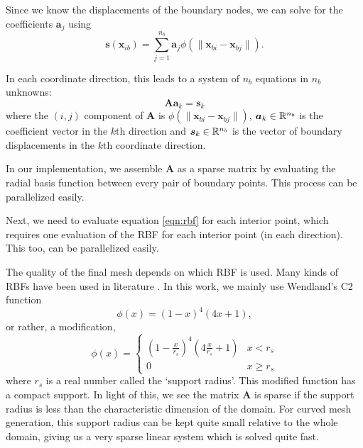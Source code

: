  Since we know the displacements of the boundary nodes, we can solve for the coefficients $\mathbf{a}_j$ using
 \begin{equation}
 \mathbf{s}(\mathbf{x}_{ib}) = \sum_{j=1}^{n_b} \mathbf{a}_j \phi(\lVert\mathbf{x}_{bi} - \mathbf{x}_{bj}\rVert).
 \end{equation}
 
 In each coordinate direction, this leads to a system of $n_b$ equations in $n_b$ unknowns:
 \begin{equation}
 \mathbf{A}\mathbf{a}_k = \mathbf{s}_k
 \end{equation}
 where the $(i,j)$ component of $\mathbf{A}$ is $\phi(\lVert\mathbf{x}_{bi} - \mathbf{x}_{bj} \rVert)$, $ \boldsymbol{a}_k \in \mathbb{R}^{n_b}$ is the coefficient vector in the $k$th direction and $\boldsymbol{s}_k \in \mathbb{R}^{n_b}$ is the vector of boundary displacements in the $k$th coordinate direction.
 
 In our implementation, we assemble $\mathbf{A}$ as a sparse matrix by evaluating the radial basis function between every pair of boundary points. This process can be parallelized easily.
 
 Next, we need to evaluate equation \eqref{eqn:rbf} for each interior point, which requires one evaluation of the RBF for each interior point (in each direction). This too, can be parallelized easily.
 
 The quality of the final mesh depends on which RBF is used. Many kinds of RBFs have been used in literature \cite{mm:rbf, mm:rbf2}. In this work, we mainly use Wendland's C2 function
 \begin{equation}
 \phi(x) = (1-x)^4(4x + 1),
 \end{equation}
 or rather, a modification,
 \begin{equation}
 \phi(x) = 
 \begin{cases}
 \left(1-\frac{x}{r_s}\right)^4\left(4\frac{x}{r_s} + 1\right) & x < r_s \\
 0 & x \geq r_s
 \end{cases}
 \end{equation}
 where $r_s$ is a real number called the `support radius'. This modified function has a compact support. In light of this, we see the matrix $\mathbf{A}$ is sparse if the support radius is less than the characteristic dimension of the domain. For curved mesh generation, this support radius can be kept quite small relative to the whole domain, giving us a very sparse linear system which is solved quite fast.
 
